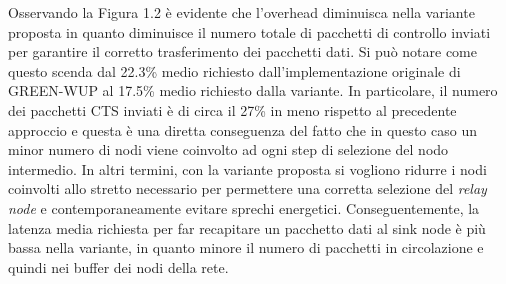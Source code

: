 \documentclass{report}
\begin{document}
Osservando la Figura 1.2 è evidente che l'overhead diminuisca nella variante proposta in quanto diminuisce il numero totale di pacchetti di controllo inviati
per garantire il corretto trasferimento dei pacchetti dati. Si può notare come questo scenda dal 22.3\% medio richiesto dall'implementazione originale
di GREEN-WUP al 17.5\% medio richiesto dalla variante. In particolare, il numero dei pacchetti CTS inviati è di circa il 27\% in meno rispetto
al precedente approccio e questa è una diretta conseguenza del fatto che in questo caso un minor numero di nodi viene coinvolto ad ogni step di
selezione del nodo intermedio. In altri termini, con la variante proposta si vogliono ridurre i nodi coinvolti allo stretto necessario per permettere
una corretta selezione del \emph{relay node} e contemporaneamente evitare sprechi energetici. Conseguentemente, la latenza media richiesta per far
recapitare un pacchetto dati al sink node è più bassa nella variante, in quanto minore il numero di pacchetti in circolazione e quindi nei buffer
dei nodi della rete.\\
\end{document}
